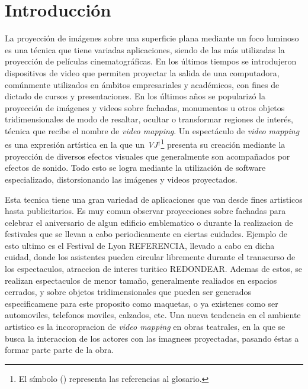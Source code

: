 ﻿\chapter{Introducción}


La proyección de imágenes sobre una superficie plana mediante un foco luminoso es una técnica que tiene variadas aplicaciones, siendo de las más utilizadas la proyección de películas cinematográficas. En los últimos tiempos se introdujeron dispositivos de video que permiten proyectar la salida de una computadora, comúnmente utilizados en ámbitos empresariales y académicos, con fines de dictado de cursos y presentaciones. En los últimos años se popularizó la proyección de imágenes y videos sobre fachadas, monumentos u otros objetos tridimensionales de modo de resaltar, ocultar o transformar regiones de interés, técnica que recibe el nombre de \emph{video mapping}.
Un espectáculo de \emph{video mapping} es una expresión artística en la que un \emph{VJ}$^\dagger$\footnote{El símbolo (\dag) representa las referencias al glosario.} presenta su creación mediante la proyección de diversos efectos visuales que generalmente son acompañados por efectos de sonido.
Todo esto se logra mediante la utilización de software especializado, distorsionando las imágenes y videos proyectados.


Esta tecnica tiene una gran variedad de aplicaciones que van desde fines artisticos hasta publicitarios. Es muy comun observar proyecciones sobre fachadas para celebrar el aniversario de algun edificio emblematico o durante la realizacion de festivales que se llevan a cabo periodicamente en ciertas cuidades. Ejemplo de esto ultimo es el Festival de Lyon REFERENCIA, llevado a cabo en dicha cuidad, donde los asistentes pueden circular libremente durante el transcurso de los espectaculos, atraccion de interes turitico REDONDEAR. Ademas de estos, se realizan espectaculos de menor tamaño, generalmente realiados en espacios cerrados, y sobre objetos tridimensionales que pueden ser generados especificamene para este proposito como maquetas, o ya existenes como ser automoviles, telefonos moviles, calzados, etc. Una nueva tendencia en el ambiente artistico es la incoropracion de \emph{video mapping} en obras teatrales, en la que se busca la interaccion de los actores con las imagnees proyectadas, pasando éstas a formar parte parte de la obra.


